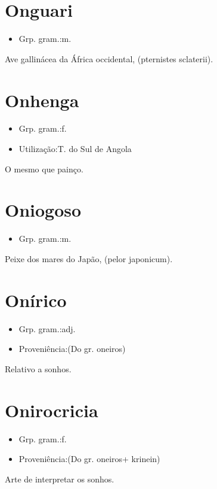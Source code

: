 \section{Onguari}
\begin{itemize}
\item {Grp. gram.:m.}
\end{itemize}
Ave gallinácea da África occidental, (\textunderscore pternistes sclaterii\textunderscore ).
\section{Onhenga}
\begin{itemize}
\item {Grp. gram.:f.}
\end{itemize}
\begin{itemize}
\item {Utilização:T. do Sul de Angola}
\end{itemize}
O mesmo que \textunderscore painço\textunderscore .
\section{Oniogoso}
\begin{itemize}
\item {Grp. gram.:m.}
\end{itemize}
Peixe dos mares do Japão, (\textunderscore pelor japonicum\textunderscore ).
\section{Onírico}
\begin{itemize}
\item {Grp. gram.:adj.}
\end{itemize}
\begin{itemize}
\item {Proveniência:(Do gr. \textunderscore oneiros\textunderscore )}
\end{itemize}
Relativo a sonhos.
\section{Onirocricia}
\begin{itemize}
\item {Grp. gram.:f.}
\end{itemize}
\begin{itemize}
\item {Proveniência:(Do gr. \textunderscore oneiros\textunderscore  + \textunderscore krinein\textunderscore )}
\end{itemize}
Arte de interpretar os sonhos.

